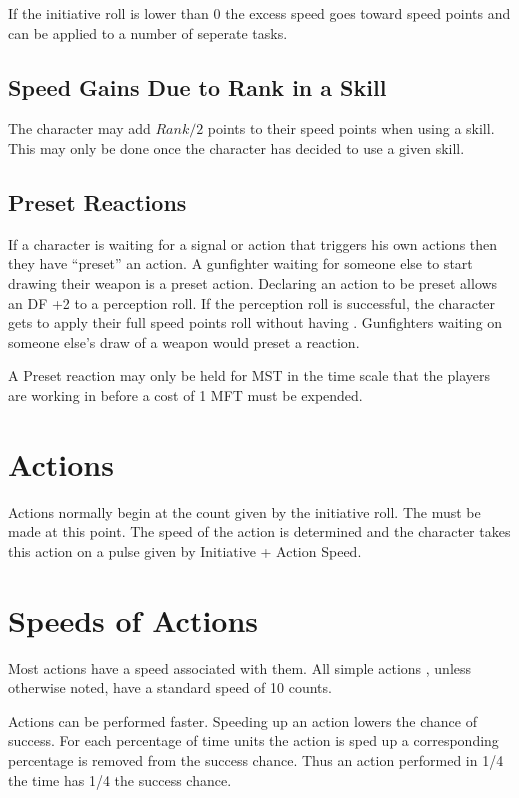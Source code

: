 If the initiative roll is lower than 0 the excess speed goes toward speed points 
and can be applied to a number of seperate tasks.

\subsection{Speed Gains Due to Rank in a Skill}

The character may add \( Rank/2 \) points to their speed points when using a
skill. This may only be done once the character has decided to use a
given skill. 

\subsection{Preset Reactions}

If a character is waiting for a signal or action that triggers his own
actions then they have ``preset'' an action. A gunfighter waiting for 
someone else to start drawing their weapon is a preset action. 
Declaring an action to be preset allows an DF +2 
to a perception roll. If the perception roll is successful, the 
character gets to apply their full speed points 
roll without having . Gunfighters waiting on someone else's  
draw of a weapon would preset a reaction. 

A Preset reaction may only be held for MST in the time scale 
that the players are working in before a cost of 1 MFT must be 
expended.

\section{Actions}

Actions normally begin at the count given by the initiative roll. The 
must be made at this point. The speed of the action is determined and 
the character takes this action on a pulse given by Initiative +
Action Speed.  

\section{Speeds of Actions}

Most actions have a speed associated with them. All simple actions 
, unless otherwise noted, have a standard speed of 10 counts. 
 


Actions can be performed faster. Speeding up an action lowers the
chance of success. For each percentage of time units the action is 
sped up a corresponding percentage is removed from 
the success chance. Thus an action performed in 1/4 the time has
1/4 the success chance.

